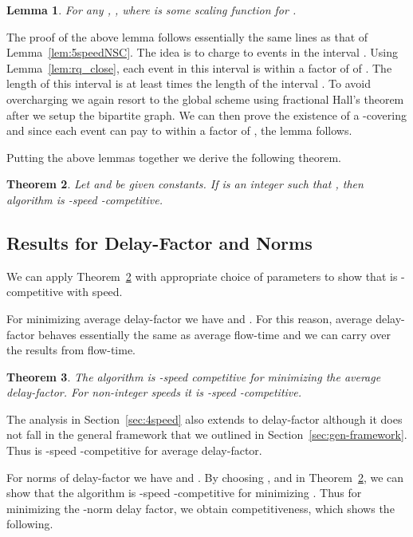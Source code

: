 \documentclass[11pt]{article}
\newtheorem{lemma}{Lemma}[section]
\newtheorem{theorem}[lemma]{Theorem}
\begin{document}
\begin{titlepage}
\begin{lemma}
    \label{lem:GNSC}
    For any , , where  is some
    scaling function for .
\end{lemma}

The proof of the above lemma follows essentially the same lines as
that of Lemma~\ref{lem:5speedNSC}. The idea is to charge 
to events in the interval . Using Lemma~\ref{lem:rq_close}, each
event in this interval is within a factor of  of .  The length of this interval is at least
 times the length of the interval . To avoid overcharging we
again resort to the global scheme using fractional Hall's theorem after we setup the bipartite graph. We can then prove
the existence of a -covering and since each event can pay to within a factor of
, the lemma follows.

Putting the above lemmas together we derive the following theorem.

\begin{theorem}
    \label{thm:G}
    Let  and  be given constants.  If 
    is an integer such that , then algorithm  is -speed
    -competitive.
\vspace{-2.5mm}
\end{theorem}


\subsection{Results for Delay-Factor and  Norms}
\label{sec:metric-results} \vspace{-0.5mm}

We can apply Theorem~\ref{thm:G} with appropriate choice of parameters
to show that  is -competitive with  speed.

For minimizing average delay-factor we have  and
. For this reason, average delay-factor behaves essentially
the same as average flow-time and we can carry over the results
from flow-time.

\begin{theorem}
  \label{thm:df_34spd}
  The algorithm  is -speed 
  competitive for minimizing the average delay-factor. For non-integer speeds
  it is -speed -competitive.
\end{theorem}

The analysis in Section~\ref{sec:4speed} also extends to delay-factor although it does not fall in the general
framework that we outlined in Section~\ref{sec:gen-framework}. Thus  is -speed
-competitive for average delay-factor.

For  norms of delay-factor we have  and . By choosing ,  and  in Theorem~\ref{thm:G}, we can show that
the algorithm  is -speed -competitive for minimizing .
Thus for minimizing the -norm delay factor, we obtain   competitiveness, which shows the following.



\end{titlepage}
\end{document}
